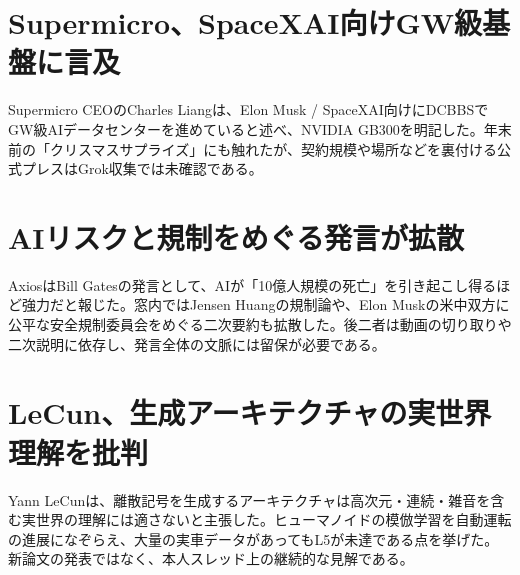 \section{Supermicro、SpaceXAI向けGW級基盤に言及}
Supermicro CEOのCharles Liangは、Elon Musk / SpaceXAI向けにDCBBSでGW級AIデータセンターを進めていると述べ、NVIDIA GB300を明記した。年末前の「クリスマスサプライズ」にも触れたが、契約規模や場所などを裏付ける公式プレスはGrok収集では未確認である。

\section{AIリスクと規制をめぐる発言が拡散}
AxiosはBill Gatesの発言として、AIが「10億人規模の死亡」を引き起こし得るほど強力だと報じた。窓内ではJensen Huangの規制論や、Elon Muskの米中双方に公平な安全規制委員会をめぐる二次要約も拡散した。後二者は動画の切り取りや二次説明に依存し、発言全体の文脈には留保が必要である。

\section{LeCun、生成アーキテクチャの実世界理解を批判}
Yann LeCunは、離散記号を生成するアーキテクチャは高次元・連続・雑音を含む実世界の理解には適さないと主張した。ヒューマノイドの模倣学習を自動運転の進展になぞらえ、大量の実車データがあってもL5が未達である点を挙げた。新論文の発表ではなく、本人スレッド上の継続的な見解である。
